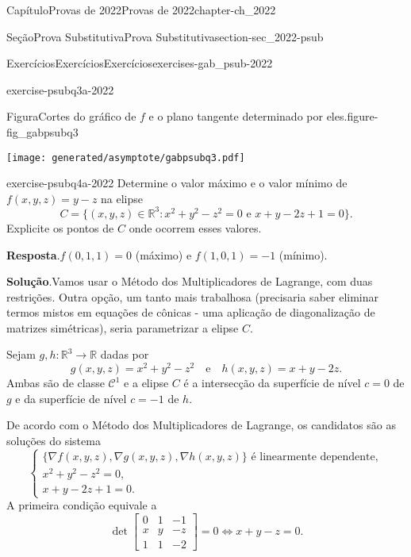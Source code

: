\documentclass[oneside,10pt,]{book}
\newcommand{\blocktitlefont}{\relax}
\numberwithin{equation}{section}
\newcommand{\R}{\mathbb R}
\begin{document}
\begin{chapterptx}{Capítulo}{Provas de 2022}{}{Provas de 2022}{}{}{chapter-ch_2022}
\begin{sectionptx}{Seção}{Prova Substitutiva}{}{Prova Substitutiva}{}{}{section-sec_2022-psub}
\begin{exercises-subsection-numberless}{Exercícios}{Exercícios}{}{Exercícios}{}{}{exercises-gab_psub-2022}
\begin{divisionexercise}{3}{}{}{exercise-psubq3a-2022}
\begin{figureptx}{Figura}{Cortes do gráfico de \(f\) e o plano tangente determinado por eles.}{figure-fig_gabpsubq3}{}
\begin{image}{0}{1}{0}{}
\texttt{[image: generated/asymptote/gabpsubq3.pdf]}
\end{image}%
\tcblower
\end{figureptx}%
\end{divisionexercise}%
\begin{divisionexercise}{4}{}{}{exercise-psubq4a-2022}%
Determine o valor máximo e o valor mínimo de \(f(x,y,z)=y-z\) na elipse%
\begin{equation*}
C = \big\{(x,y,z)\in\R^3\colon
x^2 + y^2 - z^2 =0\text{ e } x+y-2z+1=0\big\}.
\end{equation*}
Explicite os pontos de \(C\) onde ocorrem esses valores.%
\par\smallskip%
\noindent\textbf{\blocktitlefont Resposta}.\hypertarget{answer-psubq4a-2022-b}{}\quad{}\(f(0,1,1)=0\) (máximo) e \(f(1,0,1)=-1\) (mínimo).%
\par\smallskip%
\noindent\textbf{\blocktitlefont Solução}.\hypertarget{solution-psubq4a-2022-c}{}\quad{}Vamos usar o Método dos Multiplicadores de Lagrange, com duas restrições. Outra opção, um tanto mais trabalhosa (precisaria saber eliminar termos mistos em equações de cônicas - uma aplicação de diagonalização de matrizes simétricas), seria parametrizar a elipse \(C\).%
\par
Sejam \(g,h\colon\R^3\to\R\) dadas por%
\begin{equation*}
g(x,y,z) = x^2
+ y^2 - z^2 \quad \text{e} \quad h(x,y,z) = x+y-2z.
\end{equation*}
Ambas são de classe \(\mathscr{C}^1\) e a elipse \(C\) é a intersecção da superfície de nível \(c=0\) de \(g\) e da superfície de nível \(c=-1\) de \(h\).%
\par
De acordo com o Método dos Multiplicadores de Lagrange, os candidatos são as soluções do sistema%
\begin{equation*}
\begin{cases}
\{\nabla f(x,y,z), \nabla g(x,y,z), \nabla h(x,y,z)\}\text{ é
linearmente dependente},\\
x^2 + y^2 - z^2 = 0,\\
x+y-2z+1=0.
\end{cases}
\end{equation*}
A primeira condição equivale a%
\begin{equation*}
\det\begin{bmatrix}
0 & 1 & -1\\
x & y & -z\\
1 & 1 &-2
\end{bmatrix} = 0 \iff x+ y -z=0.

\end{equation*}
\end{divisionexercise}
\end{exercises-subsection-numberless}
\end{sectionptx}
\end{chapterptx}
\end{document}
